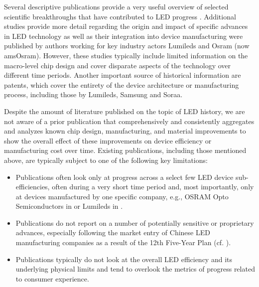 \documentclass[parskip=full]{article}
\begin{document}
Several descriptive publications provide a very useful overview of selected scientific breakthroughs that have contributed to LED progress \cite{krames2007status,Phillips2007,Bierhuizen2007,Nakamura2013,feezell2018invention,Taki2019}. Additional studies provide more detail regarding the origin and impact of specific advances in LED technology as well as their integration into device manufacturing were published by authors working for key industry actors Lumileds\cite{MuellerMach2005,Shchekin2006,lumi2015lumi,Bhardwaj2017} and Osram (now amsOsram)\cite{Haerle2004,Baur2009,laubsch2009high,hahn2014development}. However, these studies typically include limited information on the macro-level chip design and cover disparate aspects of the technology over different time periods. Another important source of historical information are patents, which cover the entirety of the device architecture or manufacturing process, including those by Lumileds\cite{margalith2011thin}, Samsung\cite{jung2014phos,cha2019semiconductor} and Soraa\cite{cich2017high}.

Despite the amount of literature published on the topic of LED history, we are not aware of a prior publication that comprehensively and consistently aggregates and analyzes known chip design, manufacturing, and material improvements to show the overall effect of these improvements on device efficiency or manufacturing cost over time. Existing publications, including those mentioned above, are typically subject to one of the following key limitations:

\begin{itemize}
    \item Publications often look only at progress across a select few LED device sub-efficiencies, often during a very short time period and, most importantly, only at devices manufactured by one specific company, e.g., OSRAM Opto Semiconductors in \cite{hahn2014development} or Lumileds in \cite{Bhardwaj2017}.
    \item Publications do not report on a number of potentially sensitive or proprietary advances, especially following the market entry of Chinese LED manufacturing companies as a result of the 12th Five-Year Plan (cf. \cite{guo2017china}).
    \item Publications typically do not look at the overall LED efficiency and its underlying physical limits and tend to overlook the metrics of progress related to consumer experience. 
\end{itemize}
\end{document}
